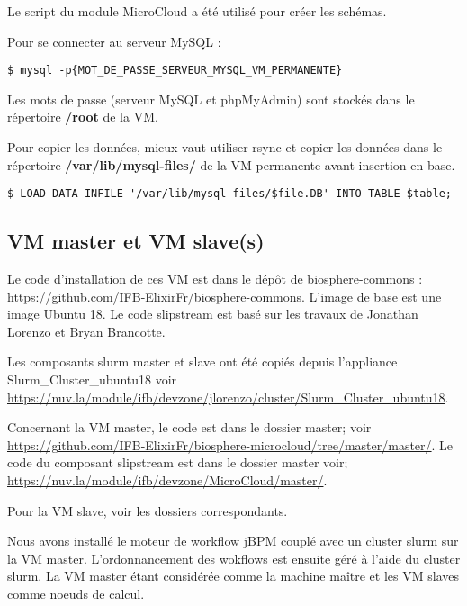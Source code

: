 Le script  du module MicroCloud a été utilisé pour créer les schémas.
\newline

Pour se connecter au serveur MySQL :
\begin{lstlisting}[style=bash]
$ mysql -p{MOT_DE_PASSE_SERVEUR_MYSQL_VM_PERMANENTE}
\end{lstlisting}

Les mots de passe (serveur MySQL et phpMyAdmin) sont stockés dans le répertoire \textbf{/root} de la VM.
\newline 

Pour copier les données, mieux vaut utiliser rsync et copier les données dans le répertoire \textbf{/var/lib/mysql-files/} de la VM permanente avant insertion en base.

\begin{lstlisting}[style=bash]
$ LOAD DATA INFILE '/var/lib/mysql-files/$file.DB' INTO TABLE $table;
\end{lstlisting}

\subsection{VM master et VM slave(s)} \label{master&slave}

Le code d’installation de ces VM est dans le dépôt de biosphere-commons : \url{https://github.com/IFB-ElixirFr/biosphere-commons}.
L'image de base est une image Ubuntu 18. Le code slipstream est basé sur les travaux de Jonathan Lorenzo et Bryan Brancotte. 

Les composants slurm master et slave ont été copiés depuis l'appliance Slurm\_Cluster\_ubuntu18 voir \url{https://nuv.la/module/ifb/devzone/jlorenzo/cluster/Slurm_Cluster_ubuntu18}.

Concernant la VM master, le code est dans le dossier master; voir
\url{https://github.com/IFB-ElixirFr/biosphere-microcloud/tree/master/master/}.
Le code du composant slipstream est dans le dossier master voir; \url{https://nuv.la/module/ifb/devzone/MicroCloud/master/}.

Pour la VM slave, voir les dossiers correspondants.\newline

Nous avons installé le moteur de workflow jBPM couplé avec un cluster slurm sur la VM master. L'ordonnancement des wokflows est ensuite géré à l'aide du cluster slurm. La VM master étant considérée comme la machine maître et les VM slaves comme noeuds de calcul.


